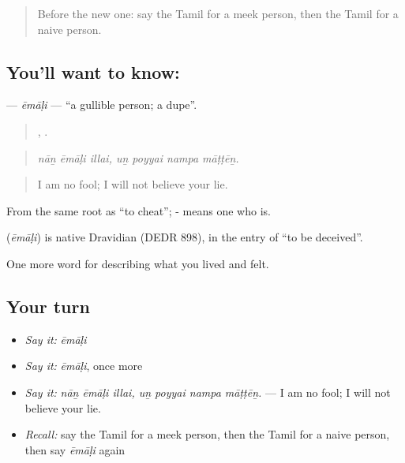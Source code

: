 \label{lesson:TA-C472-emali}



\begin{quote}
Before the new one: say the Tamil for a meek person, then the Tamil for a naive person.
\end{quote}

\subsection*{You'll want to know: }
\textbf{} — \emph{ēmāḷi} — \textquotedblleft{}a gullible person; a dupe\textquotedblright{}.

\begin{quote}
  ,    .
\end{quote}

\begin{quote}
\emph{nāṉ ēmāḷi illai, uṉ poyyai nampa māṭṭēṉ.}
\end{quote}

\begin{quote}
I am no fool; I will not believe your lie.
\end{quote}

From the same root as  \textquotedblleft{}to cheat\textquotedblright{}; - means one who is.

\begin{cousinweb}
\textbf{} (\emph{ēmāḷi}) is native Dravidian (DEDR 898), in the entry of  \textquotedblleft{}to be deceived\textquotedblright{}.
\end{cousinweb}

\begin{grammarlens}[title={What you've built}]
One more word for describing what you lived and felt.
\end{grammarlens}

\subsection*{Your turn}
\begin{itemize}
\raggedright
  \item \emph{Say it:} \emph{ēmāḷi}
  \item \emph{Say it:} \emph{ēmāḷi}, once more
  \item \emph{Say it:} \emph{nāṉ ēmāḷi illai, uṉ poyyai nampa māṭṭēṉ.} — I am no fool; I will not believe your lie.
  \item \emph{Recall:} say the Tamil for a meek person, then the Tamil for a naive person, then say \emph{ēmāḷi} again
\end{itemize}

